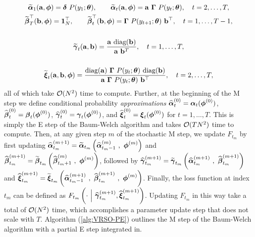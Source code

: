 \begin{gather}
    \widetilde {\boldsymbol{\alpha}}_1(\mathbf{a},\boldsymbol{\phi}) = \boldsymbol{\delta} ~ P(y_1;\boldsymbol{\theta}), \qquad \widetilde {\boldsymbol{\alpha}}_t(\mathbf{a},\boldsymbol{\phi}) = \mathbf{a} ~ \boldsymbol{\Gamma} ~ P(y_t;\boldsymbol{\theta}), \quad t = 2,\ldots,T, \label{eqn:tilde_alpha} \\
    \widetilde {\boldsymbol{\beta}}^\top_T(\mathbf{b},\boldsymbol{\phi}) = \mathbf{1}_N^\top, \qquad \widetilde {\boldsymbol{\beta}}^\top_t(\mathbf{b},\boldsymbol{\phi}) = \boldsymbol{\Gamma} ~ P(y_{t+1};\boldsymbol{\theta}) ~ \mathbf{b}^\top, \quad t = 1,\ldots,T-1, \label{eqn:tilde_beta} \\ \nonumber \\
    \widetilde {\boldsymbol{\gamma}}_t(\mathbf{a},\mathbf{b}) = \frac{\mathbf{a} ~ \text{diag}(\mathbf{b})}{\mathbf{a} ~ \mathbf{b}^T}, \quad t = 1,\ldots,T, \label{eqn:tilde_gamma} \\ \nonumber \\
    \widetilde {\boldsymbol{\xi}}_{t}(\mathbf{a},\mathbf{b},\boldsymbol{\phi}) = \frac{\text{diag}(\mathbf{a}) ~ \boldsymbol{\Gamma} ~ P(y_t;\boldsymbol{\theta}) ~ \text{diag}(\mathbf{b})}{\mathbf{a} ~ \boldsymbol{\Gamma} ~ P(y_{t};\boldsymbol{\theta}) ~ \mathbf{b}^\top}, \quad t = 2,\ldots,T \label{eqn:tilde_xi},
\end{gather}
%
all of which take $\mathcal{O}(N^2)$ time to compute. Further, at the beginning of the M step we define conditional probability \textit{approximations} $\widehat {\boldsymbol{\alpha}}_{t}^{(0)} = \boldsymbol{\alpha}_t(\boldsymbol{\phi}^{(0)})$, $\widehat {\boldsymbol{\beta}}_{t}^{(0)} = \boldsymbol{\beta}_t(\boldsymbol{\phi}^{(0)})$, $\widehat {\boldsymbol{\gamma}}_{t}^{(0)} = \boldsymbol{\gamma}_t(\boldsymbol{\phi}^{(0)})$, and $\widehat {\boldsymbol{\xi}}_{t}^{(0)} = \boldsymbol{\xi}_t(\boldsymbol{\phi}^{(0)})$ for $t = 1,\ldots,T$. This is simply the E step of the Baum-Welch algorithm and takes $\mathcal{O}(TN^2)$ time to compute. Then, at any given step $m$ of the stochastic M step, we update $F_{t_m}$ by first updating $\widehat {\boldsymbol{\alpha}}_{t_m}^{(m+1)} = \widetilde {\boldsymbol{\alpha}}_{t_m}\left(\widehat {\boldsymbol{\alpha}}_{t_m-1}^{(m)} ~,~ \boldsymbol{\phi}^{(m)}\right)$ and $\widehat {\boldsymbol{\beta}}_{t_m}^{(m+1)} = \widetilde {\boldsymbol{\beta}}_{t_m}\left(\widehat {\boldsymbol{\beta}}_{t_m+1}^{(m)} ~,~ \boldsymbol{\phi}^{(m)}\right)$, followed by $\widehat {\boldsymbol{\gamma}}_{t_m}^{(m+1)} = \widetilde {\boldsymbol{\gamma}}_{t_m}\left(\widehat {\boldsymbol{\alpha}}_{t_m}^{(m+1)} ~,~ \widehat {\boldsymbol{\beta}}_{t_m}^{(m+1)}\right)$ and $\widehat {\boldsymbol{\xi}}_{t_m}^{(m+1)} = \widetilde {\boldsymbol{\xi}}_{t_m}\left(\widehat {\boldsymbol{\alpha}}_{t_m-1}^{(m+1)} ~,~ \widehat {\boldsymbol{\beta}}_{t_m}^{(m+1)} ~,~ \boldsymbol{\phi}^{(m)}\right)$. Finally, the loss function at index $t_m$ can be defined as $F_{t_m}\left(\cdot ~ \Big | ~ \widehat {\boldsymbol{\gamma}}_{t_m}^{(m+1)},\widehat {\boldsymbol{\xi}}_{t_m}^{(m+1)}\right)$. Updating $F_{t_m}$ in this way take a total of $\mathcal{O}(N^2)$ time, which accomplishes a parameter update step that does not scale with $T$. Algorithm (\ref{alg:VRSO-PE}) outlines the M step of the Baum-Welch algorithm with a partial E step integrated in. %

